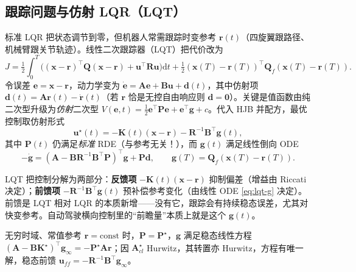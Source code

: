 \subsection{跟踪问题与仿射 LQR（LQT）}
\label{sec:lqr-lqt}

标准 LQR 把状态调节到零，但机器人常需跟踪时变参考 $\mathbf r(t)$（四旋翼跟路径、机械臂跟关节轨迹）。线性二次跟踪器（LQT）把代价改为
\begin{equation}
  J=\tfrac12\!\int_0^T\!\big((\mathbf x-\mathbf r)^\top\mathbf Q(\mathbf x-\mathbf r)+\mathbf u^\top\mathbf R\mathbf u\big)\mathrm dt+\tfrac12(\mathbf x(T)-\mathbf r(T))^\top\mathbf Q_f(\mathbf x(T)-\mathbf r(T)).
  \label{eq:lqt-cost}
\end{equation}
令误差 $\mathbf e=\mathbf x-\mathbf r$，动力学变为 $\dot{\mathbf e}=\mathbf A\mathbf e+\mathbf B\mathbf u+\mathbf d(t)$，其中仿射项 $\mathbf d(t)=\mathbf A\mathbf r(t)-\dot{\mathbf r}(t)$（若 $\mathbf r$ 恰是无控自由响应则 $\mathbf d=\mathbf0$）。关键是值函数由纯二次型升级为\emph{仿射}二次型 $V(\mathbf e,t)=\tfrac12\mathbf e^\top\mathbf P\mathbf e+\mathbf e^\top\mathbf g+c$。代入 HJB 并配方，最优控制取仿射形式
\begin{equation}
  \mathbf u^\star(t)=-\mathbf K(t)(\mathbf x-\mathbf r)-\mathbf R^{-1}\mathbf B^\top\mathbf g(t),
  \label{eq:lqt-u}
\end{equation}
其中 $\mathbf P(t)$ 仍满足\emph{标准} RDE（与参考无关！），而 $\mathbf g(t)$ 满足线性倒向 ODE
\begin{equation}
  -\dot{\mathbf g}=(\mathbf A-\mathbf B\mathbf R^{-1}\mathbf B^\top\mathbf P)^\top\mathbf g+\mathbf P\mathbf d,\qquad \mathbf g(T)=\mathbf Q_f(\mathbf x(T)-\mathbf r(T)).
  \label{eq:lqt-g}
\end{equation}

\begin{insight}
LQT 把控制分解为两部分：\textbf{反馈项} $-\mathbf K(t)(\mathbf x-\mathbf r)$ 抑制偏差（增益由 Riccati 决定）；\textbf{前馈项} $-\mathbf R^{-1}\mathbf B^\top\mathbf g(t)$ 预补偿参考变化（由线性 ODE \cref{eq:lqt-g} 决定）。前馈是 LQT 相对 LQR 的本质新增——没有它，跟踪会有持续稳态误差，尤其对快变参考。自动驾驶横向控制里的“前瞻量”本质上就是这个 $\mathbf g(t)$。
\end{insight}

无穷时域、常值参考 $\mathbf r=\mathrm{const}$ 时，$\mathbf P=\mathbf P^\star$，$\mathbf g$ 满足稳态线性方程 $(\mathbf A-\mathbf B\mathbf K^\star)^\top\mathbf g_\infty=-\mathbf P^\star\mathbf A\mathbf r$；因 $\mathbf A_{cl}^\star$ Hurwitz，其转置亦 Hurwitz，方程有唯一解，稳态前馈 $\mathbf u_{ff}=-\mathbf R^{-1}\mathbf B^\top\mathbf g_\infty$。

